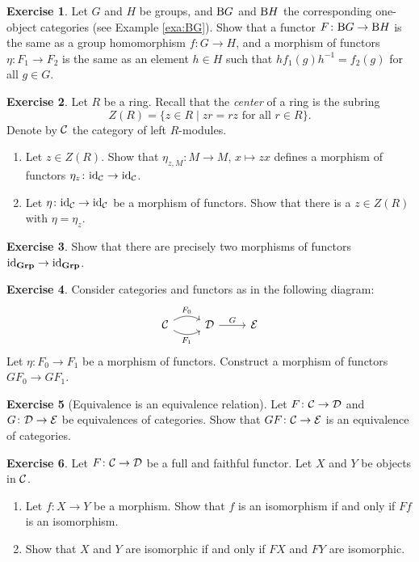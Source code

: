\documentclass[11pt]{amsbook}
\def\cE{{\mathcal{E}}} \def\cG{{\mathcal{G}}} \def\cH{{\mathcal{H}}}
\def\id{{\rm id}}
\def\Grp{\mathbf{Grp}}
\theoremstyle{plain}
\theoremstyle{definition}
\newtheorem{exercise}{Exercise}
\begin{document}
\begin{exercise}
Let $G$ and $H$ be groups, and ${\mathrm B} G$ and ${\mathrm B} H$ the corresponding one-object categories (see Example \ref{exa:BG}). Show that a functor $F\colon {\mathrm B} G \to {\mathrm B} H$ is the same as a group homomorphism $f\colon G\to H$, and a morphism of functors $\eta\colon F_1 \to F_2$ is the same as an element $h\in H$ such that $h f_1(g) h^{-1} = f_2(g)$ for all $g\in G$.
\end{exercise}


\begin{exercise}
Let $R$ be a ring. Recall that the \emph{center} of a ring is the subring
\[
	Z(R) = \{ z \in R \mid zr=rz \text{ for all $r \in R$} \}.
\]
Denote by ${\mathcal{C}}$ the category of left $R$-modules.
\begin{enumerate}
\item Let $z\in Z(R)$. Show that $\eta_{z,M} \colon M \to M,\, x \mapsto zx$ defines a morphism of functors $\eta_z\colon \id_\cC \to \id_\cC$.
\item Let $\eta \colon \id_\cC \to \id_\cC$ be a morphism of functors. Show that there is a $z\in Z(R)$ with $\eta = \eta_z$.
\end{enumerate}
\end{exercise}

\begin{exercise}
Show that there are precisely two morphisms of functors $\id_\Grp \to \id_\Grp$.  
\end{exercise}

\begin{exercise}
Consider categories and functors as in the following diagram:
\[
\begin{tikzcd}
\cC \arrow[bend left]{r}{F_0} \arrow[bend right,swap]{r}{F_1} & \cD \arrow{r}{G} & \cE
\end{tikzcd}
\]
Let $\eta\colon F_0 \to F_1$ be a morphism of functors. Construct a morphism of functors $GF_0 \to GF_1$.
\end{exercise}

\begin{exercise}[Equivalence is an equivalence relation]
Let $F\colon {\mathcal{C}} \to {\mathcal{D}}$ and $G\colon \cD\to \cE$ be equivalences of categories. Show that $GF\colon \cC \to \cE$ is an equivalence of categories.\end{exercise}

\begin{exercise}\label{exc:fully-faithful-isomorphism}
Let $F\colon {\mathcal{C}} \to {\mathcal{D}}$ be a full and faithful functor. Let $X$ and $Y$ be objects in ${\mathcal{C}}$. 
\begin{enumerate}
\item Let $f \colon X\to Y$ be a morphism. Show that $f$ is an isomorphism if and only if $Ff$ is an isomorphism.
\item Show that $X$ and $Y$ are isomorphic if and only if $FX$ and $FY$ are isomorphic.
\end{enumerate}
\end{exercise}
\end{document}
